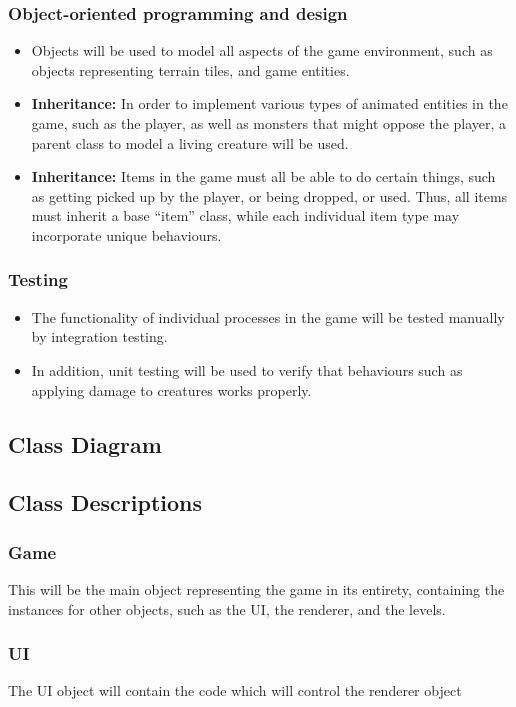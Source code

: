 \documentclass{article}
\begin{document}
\subsubsection{Object-oriented programming and design}
\begin{itemize}
    \item Objects will be used to model all aspects of the game environment, such as objects representing terrain tiles, and game entities.
    \item \textbf{Inheritance:} In order to implement various types of animated entities in the game, such as the player, as well as monsters that might oppose the player, a parent class to model a living creature will be used.
    \item \textbf{Inheritance:} Items in the game must all be able to do certain things, such as getting picked up by the player, or being dropped, or used. Thus, all items must inherit a base ``item'' class, while each individual item type may incorporate unique behaviours.
\end{itemize}
\subsubsection{Testing}
\begin{itemize}
    \item The functionality of individual processes in the game will be tested manually by integration testing.
    \item In addition, unit testing will be used to verify that behaviours such as applying damage to creatures works properly.
\end{itemize}
\subsection{Class Diagram}
\subsection{Class Descriptions}
\subsubsection{Game}
This will be the main object representing the game in its entirety, containing the instances for other objects, such as the UI, the renderer, and the levels.
\subsubsection{UI}
The UI object will contain the code which will control the renderer object
\end{document}

